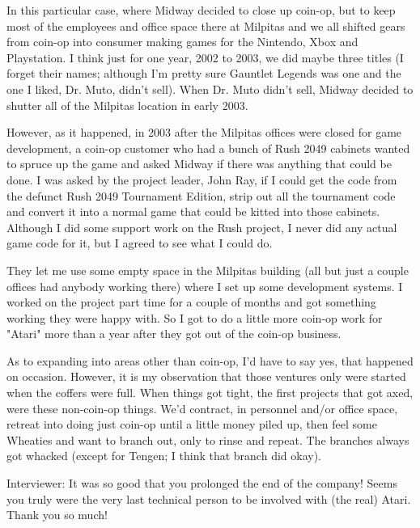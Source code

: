 In this particular case, where Midway decided to close up coin-op, but to keep most of the employees and office space there at Milpitas and we all shifted gears from coin-op into consumer making games for the Nintendo, Xbox and Playstation. I think just for one year, 2002 to 2003, we did maybe three titles (I forget their names; although I'm pretty sure Gauntlet Legends was one and the one I liked, Dr. Muto, didn't sell). When Dr. Muto didn't sell, Midway decided to shutter all of the Milpitas location in early 2003.

However, as it happened, in 2003 after the Milpitas offices were closed for game development, a coin-op customer who had a bunch of Rush 2049 cabinets wanted to spruce up the game and asked Midway if there was anything that could be done. I was asked by the project leader, John Ray, if I could get the code from the defunct Rush 2049 Tournament Edition, strip out all the tournament code and convert it into a normal game that could be kitted into those cabinets. Although I did some support work on the Rush project, I never did any actual game code for it, but I agreed to see what I could do. 

They let me use some empty space in the Milpitas building (all but just a couple offices had anybody working there) where I set up some development systems. I worked on the project part time for a couple of months and got something working they were happy with. So I got to do a little more coin-op work for "Atari" more than a year after they got out of the coin-op business.

As to expanding into areas other than coin-op, I'd have to say yes, that happened on occasion. However, it is my observation that those ventures only were started when the coffers were full. When things got tight, the first projects that got axed, were these non-coin-op things. We'd contract, in personnel and/or office space, retreat into doing just coin-op until a little money piled up, then feel some Wheaties and want to branch out, only to rinse and repeat. The branches always got whacked (except for Tengen; I think that branch did okay).

\textcolor{interviewer}{Interviewer:} It was so good that you prolonged the end of the company! Seems you truly were the very last technical person to be involved with (the real) Atari. Thank you so much!